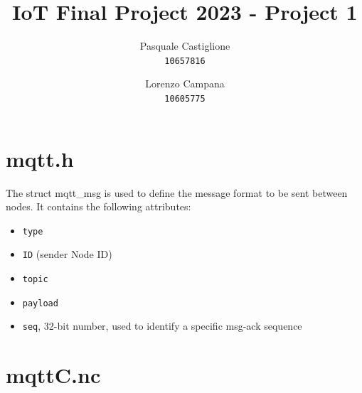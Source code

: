 \documentclass[11pt]{article}
\title{\textbf{IoT Final Project 2023 - Project 1}}
\author{
  Pasquale Castiglione\\
	\texttt{10657816}
  \and
  Lorenzo Campana\\
  \texttt{10605775}
}
\date{}
\begin{document}
\maketitle
\section*{mqtt.h}
The struct mqtt\_msg is used to define the message format to be sent between nodes. It contains the following attributes:
\begin{itemize}
  \item \texttt{type}
  \item \texttt{ID} (sender Node ID)
  \item \texttt{topic}
  \item \texttt{payload}
  \item \texttt{seq}, 32-bit number, used to identify a specific msg-ack sequence
\end{itemize}

\section*{mqttC.nc}
\end{document}
